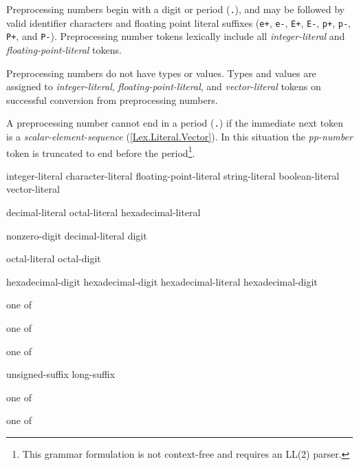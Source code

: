 \p Preprocessing numbers begin with a digit or period (\texttt{.}), and may be
followed by valid identifier characters and floating point literal suffixes
(\texttt{e+}, \texttt{e-}, \texttt{E+}, \texttt{E-}, \texttt{p+}, \texttt{p-},
\texttt{P+}, and \texttt{P-}). Preprocessing number tokens lexically include all
\textit{integer-literal} and \textit{floating-point-literal} tokens.

\p Preprocessing numbers do not have types or values. Types and values are
assigned to \textit{integer-literal}, \textit{floating-point-literal}, and
\textit{vector-literal} tokens on successful conversion from preprocessing
numbers.

\p A preprocessing number cannot end in a period (\texttt{.}) if the immediate
next token is a \textit{scalar-element-sequence} (\ref{Lex.Literal.Vector}). In
this situation the \textit{pp-number} token is truncated to end before the
period\footnote{This grammar formulation is not context-free and requires an
LL(2) parser.}.






\begin{grammar}
  \br
  integer-literal\br
  character-literal\br
  floating-point-literal\br
  string-literal\br
  boolean-literal\br
  vector-literal
\end{grammar}


\begin{grammar}
  \br
  decimal-literal \br
  octal-literal \br
  hexadecimal-literal \br

  \br
  nonzero-digit\br
  decimal-literal digit\br

  \br
  octal-literal octal-digit\br

  \br
   hexadecimal-digit\br
   hexadecimal-digit\br
  hexadecimal-literal hexadecimal-digit\br

   \textnormal{one of}\br
  \br

   \textnormal{one of}\br
  \br

   \textnormal{one of}\br
  \br
  \br
  \br

  \br
  unsigned-suffix \br
  long-suffix \br

   \textnormal{one of}\br
  \br

   \textnormal{one of}\br
\end{grammar}

